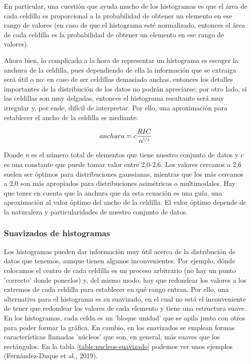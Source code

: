 \documentclass[12pt]{article}
\begin{document}
En particular, una cuestión que ayuda mucho de los histogramas es que el área de cada celdilla es proporcional a la probabilidad de obtener un elemento en ese rango de valores (en caso de que el histograma esté normalizado, entonces el área de cada celdilla es la probabilidad de obtener un elemento en ese rango de valores).

Ahora bien, lo complicado a la hora de representar un histograma es escoger la anchura de la celdilla, pues dependiendo de ella la información que se extraiga será útil o no: en caso de ser celdillas demasiado anchas, entonces los detalles importantes de la distribución de los datos no podrán apreciarse; por otro lado, si las celdillas son muy delgadas, entonces el histograma resultante será muy irregular y, por ende, difícil de interpretar. Por ello, una aproximación para establecer el ancho de la celdilla es mediante:

\begin{equation}
anchura = c \frac{RIC}{n^{\nicefrac{1}{3}}}
\label{eq:bin_width}
\end{equation}

Donde \textit{n} es el número total de elementos que tiene nuestro conjunto de datos y $c$ es una constante que puede tomar valor entre 2,0-2,6. Los valores cercanos a 2,6 suelen ser óptimos para distribuciones gaussianas, mientras que los más cercanos a 2,0 son más apropiados para distribuciones asimétricas o multimodales. Hay que tener en cuenta que la anchura que da esta ecuación es una guía, una aproximación al valor óptimo del ancho de la celdilla. El valor óptimo depende de la naturaleza y particularidades de nuestro conjunto de datos.

\subsubsection{Suavizados de histogramas}

Los histogramas pueden dar información muy útil acerca de la distribución de datos que tenemos, aunque tienen algunos inconvenientes. Por ejemplo, dónde colocamos el centro de cada celdilla es un proceso arbitrario (no hay un punto 'correcto' donde ponerlos) y, del mismo modo, hay que redondear los valores a los extremos de cada celdilla para establecer en qué rango entran. Por ello, una alternativa para el histograma es su suavizado, en el cual no está el inconveniente de tener que redondear los valores de cada elemento y tiene una estructura suave. En los histogramas, cada celda es un 'bloque unidad' que se apila junto con otros para poder formar la gráfica. En cambio, en los suavizados se emplean formas características llamadas 'núcleos' que son, en general, más suaves que los rectángulos. En la tabla \ref{table:nucleos-suavizado} podemos ver unos ejemplos (Fernández-Duque et al., 2019).
\end{document}
